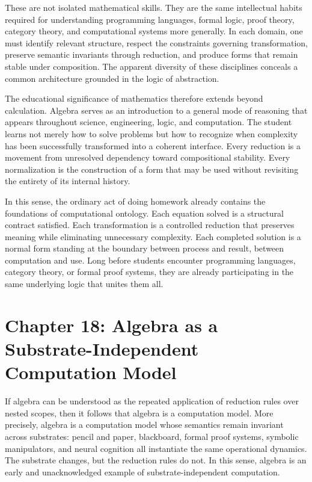 \documentclass[12pt,letterpaper]{article}
\theoremstyle{remark}
\begin{document}
These are not isolated mathematical skills. They are the same intellectual habits required for understanding programming languages, formal logic, proof theory, category theory, and computational systems more generally. In each domain, one must identify relevant structure, respect the constraints governing transformation, preserve semantic invariants through reduction, and produce forms that remain stable under composition. The apparent diversity of these disciplines conceals a common architecture grounded in the logic of abstraction.

The educational significance of mathematics therefore extends beyond calculation. Algebra serves as an introduction to a general mode of reasoning that appears throughout science, engineering, logic, and computation. The student learns not merely how to solve problems but how to recognize when complexity has been successfully transformed into a coherent interface. Every reduction is a movement from unresolved dependency toward compositional stability. Every normalization is the construction of a form that may be used without revisiting the entirety of its internal history.

In this sense, the ordinary act of doing homework already contains the foundations of computational ontology. Each equation solved is a structural contract satisfied. Each transformation is a controlled reduction that preserves meaning while eliminating unnecessary complexity. Each completed solution is a normal form standing at the boundary between process and result, between computation and use. Long before students encounter programming languages, category theory, or formal proof systems, they are already participating in the same underlying logic that unites them all.

\newpage
\section{Chapter 18: Algebra as a Substrate-Independent Computation Model}

If algebra can be understood as the repeated application of reduction rules over nested scopes, then it follows that algebra is a computation model. More precisely, algebra is a computation model whose semantics remain invariant across substrates: pencil and paper, blackboard, formal proof systems, symbolic manipulators, and neural cognition all instantiate the same operational dynamics. The substrate changes, but the reduction rules do not. In this sense, algebra is an early and unacknowledged example of substrate-independent computation.
\end{document}
